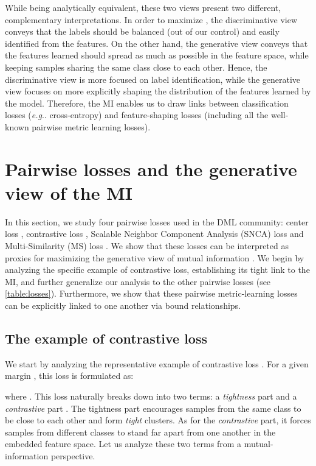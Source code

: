 \documentclass[runningheads]{llncs}
\makeatletter
\DeclareRobustCommand\onedot{\futurelet\@let@token\@onedot}
\def\@onedot{\ifx\@let@token.\else.\null\fi\xspace}
\def\eg{\emph{e.g}\onedot} \def\Eg{\emph{E.g}\onedot}
\makeatother
\begin{document}
While being analytically equivalent, these two views present two different, complementary interpretations. In order to maximize , the discriminative view conveys that the labels should be balanced (out of our control) and 
easily identified from the features. On the other hand, the generative view conveys that the features learned should spread as much as possible in the feature space, while keeping samples sharing the same class close to each other. Hence, the discriminative view is more focused on label identification, while the generative view focuses on more explicitly shaping the distribution of the features learned by the model. Therefore, the MI enables us to draw links between classification losses (\eg cross-entropy) and feature-shaping losses (including all the well-known pairwise metric learning losses). \section{Pairwise losses and the generative view of the MI}\label{sec:pairwise_losses}

In this section, we study four pairwise losses used in the DML community: center loss \cite{center_loss}, contrastive loss \cite{hadsell2006dimensionality}, Scalable Neighbor Component Analysis (SNCA) loss \cite{wu2018improving} and Multi-Similarity (MS) loss \cite{wang2019multi}. We show that these losses can be interpreted as proxies for maximizing the generative view of mutual information . We begin by analyzing the specific example of contrastive loss, establishing its tight link to the MI, and further generalize our analysis to the other pairwise losses (see \autoref{table:losses}). Furthermore, we show that these pairwise metric-learning losses can be explicitly linked to one another via bound relationships. 

\subsection{The example of contrastive loss}\label{subsec:contrastive_example}

We start by analyzing the representative example of contrastive loss \cite{hadsell2006dimensionality}. For a given margin , this loss is formulated as:

where . This loss naturally breaks down into two terms: a \textit{tightness} part  and a \textit{contrastive} part . The tightness part encourages samples from the same class to be close to each other and form \textit{tight} clusters. As for the \textit{contrastive} part, it forces samples from different classes to stand far apart from one another in the embedded feature space. Let us analyze these two terms from a mutual-information perspective.
\end{document}

